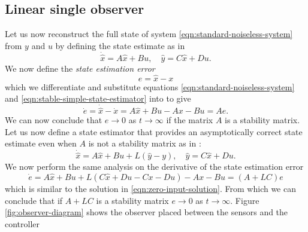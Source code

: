 \subsection{Linear single observer}
Let us now reconstruct the full state of system \eqref{eqn:standard-noiseless-system} from  $y$ and $u$ by defining the state estimate as in \cite[Section 16.5]{Hespanha2018LinearTheory}
\begin{equation}\label{eqn:stable-simple-state-estimator}
    \dot{\hat{x}} = A\hat{x} + Bu, \quad \hat{y} = C\hat{x} + Du.
\end{equation}
We now define the \textit{state estimation error}
\begin{equation}\label{eqn:estimate-error}
    e = \hat{x} - x
\end{equation}
which we differentiate and substitute equations \eqref{eqn:standard-noiseless-system} and \eqref{eqn:stable-simple-state-estimator} into to give
\begin{equation*}
    \dot{e} = \dot{\hat{x}} - \dot{x} = A\hat{x} + Bu - Ax - Bu = Ae.
\end{equation*}
We can now conclude that $e \rightarrow 0$ as $t \rightarrow \infty$ if the matrix $A$ is a stability matrix. Let us now define a state estimator that provides an asymptotically correct state estimate even when $A$ is not a stability matrix as in \cite[Section 16.5]{Hespanha2018LinearTheory}:
\begin{equation}\label{eqn:unstable-simple-state-estimator}
    \dot{\hat{x}} = A\hat{x} + Bu + L(\hat{y} - y), \quad \hat{y} = C\hat{x} + Du.
\end{equation}
We now perform the same analysis on the derivative of the state estimation error
\begin{equation}\label{eqn:error-linear-observer}
    \dot{e} = A\hat{x} + Bu + L(C\hat{x} + Du - Cx - Du) - Ax - Bu = (A+LC)e
\end{equation}
which is similar to the solution in \eqref{eqn:zero-input-solution}. From which we can conclude that if $A+LC$ is a stability matrix $e \rightarrow 0$ as $t \rightarrow \infty$. Figure \ref{fig:observer-diagram} shows the observer placed between the sensors and the controller

